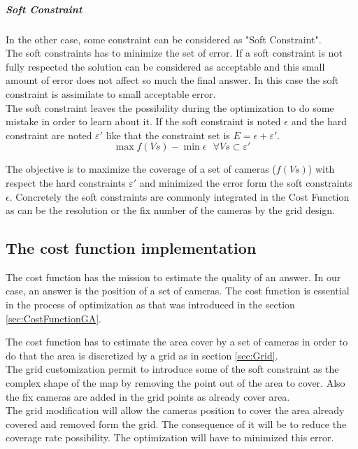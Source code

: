  \subparagraph{Soft Constraint}
 In the other case, some constraint can be considered as "Soft Constraint".\\ 
 The soft constraints has to minimize the set of error. If a soft constraint is not fully respected the solution can be considered as acceptable and this small amount of error does not affect so much the final answer. In this case the soft constraint is assimilate to small acceptable error. \\
 The soft constraint leaves the possibility during the optimization to do some mistake in order to learn about it.  
 If the soft constraint is noted $\epsilon$ and the hard constraint are noted $ \varepsilon '$ like that the constraint set is $E=\epsilon+\varepsilon'$.\\
 
  \begin{equation}\label{eq:constraintEpsilon}
 	\max f(Vs) - \min \epsilon  \mbox{  } \forall Vs \subset \varepsilon'
 \end{equation}
 
The objective is to maximize the coverage of a set of cameras ($f(Vs)$) with respect the hard constraints $\varepsilon'$ and minimized the error form the soft constraints $\epsilon$.
Concretely the soft constraints are commonly integrated in the Cost Function as can be the resolution or the fix number of the cameras by the grid design. 


\subsection{The cost function implementation} \label{sec:costFun}

The cost function has the mission to estimate the quality of an answer. In our case, an answer is the position  of a set of cameras. The cost function is essential in the process of optimization as that was introduced in the section \ref{sec:CostFunctionGA}.

The cost function has to estimate the area cover by a set of cameras in order to do that the area is discretized by a grid as in section \ref{sec:Grid}. \\
The grid customization permit to introduce some of the soft constraint as the complex shape of the map by removing the point out of the area to cover. Also the fix cameras are added in the grid points as already cover area. \\
The grid modification will allow the cameras position to cover the area already covered and removed form the grid. The consequence of it will be to reduce the coverage rate possibility. The optimization will have to minimized this error.

